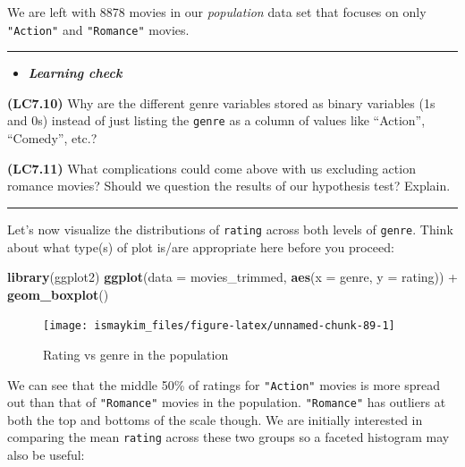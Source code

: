 \documentclass[]{tufte-book}
\newenvironment{Shaded}{\begin{snugshade}}{\end{snugshade}}
\newcommand{\KeywordTok}[1]{\textcolor[rgb]{0.13,0.29,0.53}{\textbf{{#1}}}}
\newcommand{\DataTypeTok}[1]{\textcolor[rgb]{0.13,0.29,0.53}{{#1}}}
\newcommand{\StringTok}[1]{\textcolor[rgb]{0.31,0.60,0.02}{{#1}}}
\newcommand{\NormalTok}[1]{{#1}}
\let\oldrule=\rule
\renewcommand{\rule}[1]{\oldrule{\linewidth}}
\newenvironment{rmdblock}[1]
  {\begin{shaded*}
  \begin{itemize}
  \renewcommand{\labelitemi}{
    \raisebox{-.7\height}[0pt][0pt]{
    }
  }
  \item
  }
  {
  \end{itemize}
  \end{shaded*}
  }
\newenvironment{learncheck}
  {\begin{rmdblock}{warning}}
  {\end{rmdblock}}
\theoremstyle{definition}
\theoremstyle{definition}
\theoremstyle{remark}
\begin{document}
We are left with 8878 movies in our \emph{population} data set that
focuses on only \texttt{"Action"} and \texttt{"Romance"} movies.

\begin{center}\rule{0.5\linewidth}{\linethickness}\end{center}

\begin{learncheck}
\textbf{\emph{Learning check}}
\end{learncheck}

\textbf{(LC7.10)} Why are the different genre variables stored as binary
variables (1s and 0s) instead of just listing the \texttt{genre} as a
column of values like ``Action'', ``Comedy'', etc.?

\textbf{(LC7.11)} What complications could come above with us excluding
action romance movies? Should we question the results of our hypothesis
test? Explain.

\begin{center}\rule{0.5\linewidth}{\linethickness}\end{center}

Let's now visualize the distributions of \texttt{rating} across both
levels of \texttt{genre}. Think about what type(s) of plot is/are
appropriate here before you proceed:

\begin{Shaded}
\begin{Highlighting}[]
\KeywordTok{library}\NormalTok{(ggplot2)}
\KeywordTok{ggplot}\NormalTok{(}\DataTypeTok{data =} \NormalTok{movies_trimmed, }\KeywordTok{aes}\NormalTok{(}\DataTypeTok{x =} \NormalTok{genre, }\DataTypeTok{y =} \NormalTok{rating)) +}
\StringTok{  }\KeywordTok{geom_boxplot}\NormalTok{()}
\end{Highlighting}
\end{Shaded}

\begin{figure}

{\centering \texttt{[image: ismaykim\_files/figure-latex/unnamed-chunk-89-1]} 

}

\caption[Rating vs genre in the population]{Rating vs genre in the population}\label{fig:unnamed-chunk-89}
\end{figure}

We can see that the middle 50\% of ratings for \texttt{"Action"} movies
is more spread out than that of \texttt{"Romance"} movies in the
population. \texttt{"Romance"} has outliers at both the top and bottoms
of the scale though. We are initially interested in comparing the mean
\texttt{rating} across these two groups so a faceted histogram may also
be useful:
\end{document}
